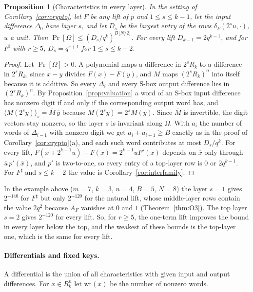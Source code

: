 \documentclass[11pt]{article}
\newtheorem{proposition}[theorem]{Proposition}
\theoremstyle{definition}
\theoremstyle{remark}
\newcommand{\ol}[1]{\overline{#1}}
\begin{document}
\begin{proposition}[Characteristics in every layer]\label{prop:layerchar}
In the setting of Corollary~\ref{cor:crypto}, let $F$ be any lift of $p$ and $1\le s\le k-1$, let the input difference
$\Delta_0$ have layer $s$, and let $D_s$ be the largest entry of the rows $\delta_F(2^su,\cdot)$, $u$ a unit. Then
$\Pr[\Omega]\le(D_s/q^k)^{B\lfloor N/2\rfloor}$. For every lift $D_{k-1}=2q^{k-1}$, and for $F^\sharp$ with $r\ge5$,
$D_s=q^{s+1}$ for $1\le s\le k-2$.
\end{proposition}
\begin{proof}
Let $\Pr[\Omega]>0$. A polynomial maps a difference in $2^sR_k$ to a difference in $2^sR_k$, since $x-y$ divides
$F(x)-F(y)$, and $M$ maps $(2^sR_k)^n$ into itself because it is additive. So every $\Delta_i$ and every S-box output
difference lies in $(2^sR_k)^n$. By Proposition~\ref{prop:valuation} a word of an S-box input difference has nonzero
digit if and only if the corresponding output word has, and $\langle M(2^sy)\rangle_s=\ol M\,\ol y$ because
$M(2^sy)=2^sM(y)$. Since $\ol M$ is invertible, the digit vectors stay nonzero, so the layer $s$ is invariant along
$\Omega$. With $a_i$ the number of words of $\Delta_{i-1}$ with nonzero digit we get $a_i+a_{i+1}\ge B$ exactly as in
the proof of Corollary~\ref{cor:crypto}(a), and each such word contributes at most $D_s/q^k$. For every lift,
$F(x+2^{k-1}u)-F(x)=2^{k-1}uF'(x)$ depends on $\ol x$ only through $\ol u\,p'(\ol x)$, and $p'$ is two-to-one, so every
entry of a top-layer row is $0$ or $2q^{k-1}$. For $F^\sharp$ and $s\le k-2$ the value is
Corollary~\ref{cor:interfamily}.
\end{proof}

In the example above ($m=7$, $k=3$, $n=4$, $B=5$, $N=8$) the layer $s=1$ gives $2^{-140}$ for $F^\sharp$ but only
$2^{-120}$ for the natural lift, whose middle-layer rows contain the value $2q^2$ because $A_F$ vanishes at $0$ and $1$
(Theorem~\ref{thm:O3}). The top layer $s=2$ gives $2^{-120}$ for every lift. So, for $r\ge5$, the one-term lift improves
the bound in every layer below the top, and the weakest of these bounds is the top-layer one, which is the same for every
lift.

\paragraph{Differentials and fixed keys.}
A differential is the union of all characteristics with given input and output differences. For $x\in R_k^n$ let
$\mathrm{wt}(x)$ be the number of nonzero words.
\end{document}
